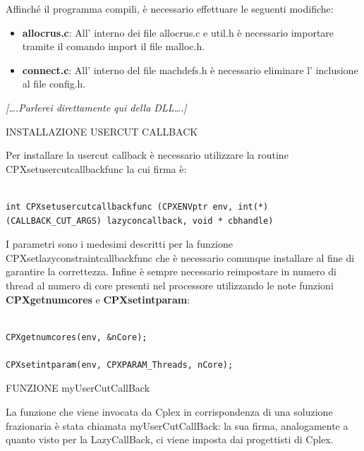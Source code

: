 \documentclass[11pt]{article}
\begin{document}
Affinché il programma compili, è necessario effettuare le seguenti modifiche:

\begin{itemize}
	\item \textbf{allocrus.c}: All' interno dei file allocrus.c e util.h è necessario importare tramite il comando import il file malloc.h.
	\item \textbf{connect.c}: All' interno del file machdefs.h è necessario eliminare l' inclusione al file config.h.
\end{itemize}

\textit{[….Parlerei direttamente qui della DLL….]}


\vspace{2\baselineskip}
INSTALLAZIONE USERCUT CALLBACK
\vspace{2\baselineskip}


Per installare la usercut callback è necessario utilizzare la routine CPXsetusercutcallbackfunc la cui firma è:


\begin{lstlisting}

int CPXsetusercutcallbackfunc (CPXENVptr env, int(*)(CALLBACK_CUT_ARGS) lazyconcallback, void * cbhandle)

\end{lstlisting}



I parametri sono i medesimi descritti per la funzione CPXsetlazyconstraintcallbackfunc che è necessario comunque installare al fine di garantire la correttezza. Infine è sempre necessario reimpostare in numero di thread al numero di core presenti nel processore utilizzando le note funzioni \textbf{CPXgetnumcores} e \textbf{CPXsetintparam}:


\begin{lstlisting}

CPXgetnumcores(env, &nCore);
	
CPXsetintparam(env, CPXPARAM_Threads, nCore);

\end{lstlisting}



\vspace{2\baselineskip}
FUNZIONE myUserCutCallBack
\vspace{2\baselineskip}

La funzione che viene invocata da Cplex in corrispondenza di una soluzione frazionaria è stata chiamata myUserCutCallBack: la sua firma, analogamente a quanto visto per la LazyCallBack, ci viene imposta dai progettisti di Cplex.
\end{document}

